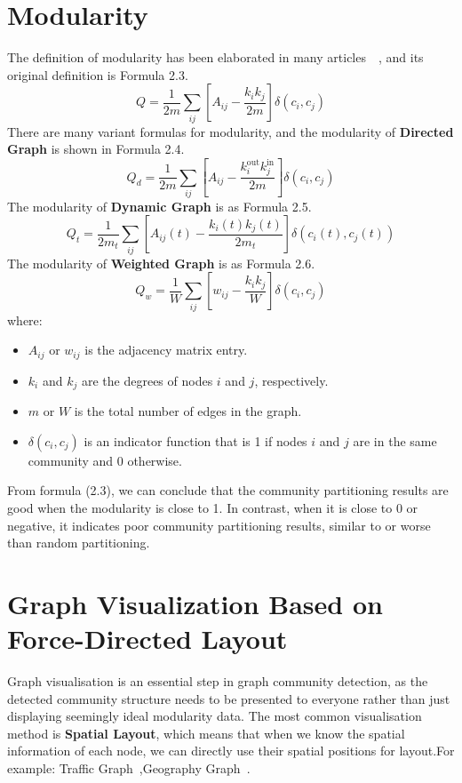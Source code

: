 \documentclass[ %
                    author={Tengyao Tu},
                supervisor={Dr. James Pope},
                    degree={MSc},
                     title={A New Perspective on Graph Community Detection: Combining Traditional Methods with Deep Learning Approaches},
                  subtitle={Applying to Telecom Networks and Diverse Datasets},
                      type={},
                      year={2024}]{dissertation}
\begin{document}
\section{Modularity}
The definition of modularity has been elaborated in many articles~\cite{faraj2022community}~\cite{leicht2008community}, and its original definition is Formula 2.3.
\begin{equation}
Q = \frac{1}{2m} \sum_{ij} \left[ A_{ij} - \frac{k_i k_j}{2m} \right] \delta(c_i, c_j)
\label{eq:modularity}
\end{equation}
There are many variant formulas for modularity, and the modularity of \textbf{Directed Graph} is shown in Formula 2.4.
\begin{equation}
Q_d = \frac{1}{2m} \sum_{ij} \left[ A_{ij} - \frac{k_i^{\text{out}} k_j^{\text{in}}}{2m} \right] \delta(c_i, c_j)
\label{eq: directedmodularity}
\end{equation}
The modularity of \textbf{Dynamic Graph} is as Formula 2.5.
\begin{equation}
Q_t = \frac{1}{2m_t} \sum_{ij} \left[ A_{ij}(t) - \frac{k_i(t) k_j(t)}{2m_t} \right] \delta(c_i(t), c_j(t))
\label{eq: dynamicmodularity}
\end{equation}
The modularity of  \textbf{Weighted Graph} is as Formula 2.6.
\begin{equation}
Q_w = \frac{1}{W} \sum_{ij} \left[ w_{ij} - \frac{k_i k_j}{W} \right] \delta(c_i, c_j)
\label{eq: weightedmodularity}
\end{equation}
where:
\begin{itemize}
  \item $A_{ij}$ or $w_{ij}$ is the adjacency matrix entry.
  \item $k_i$ and $k_j$ are the degrees of nodes $i$ and $j$, respectively.
  \item $m$ or $W$ is the total number of edges in the graph.
  \item $\delta(c_i, c_j)$ is an indicator function that is 1 if nodes $i$ and $j$ are in the same community and 0 otherwise.
\end{itemize}
From formula (2.3), we can conclude that the community partitioning results are good when the modularity is close to 1. In contrast, when it is close to 0 or negative, it indicates poor community partitioning results, similar to or worse than random partitioning.
\section{Graph Visualization Based on Force-Directed Layout}
Graph visualisation is an essential step in graph community detection, as the detected community structure needs to be presented to everyone rather than just displaying seemingly ideal modularity data. The most common visualisation method is \textbf{Spatial Layout}, which means that when we know the spatial information of each node, we can directly use their spatial positions for layout.For example: Traffic Graph~\cite{shin2024pgcn},Geography Graph~\cite{wang2024hypergraph}.
\end{document}
